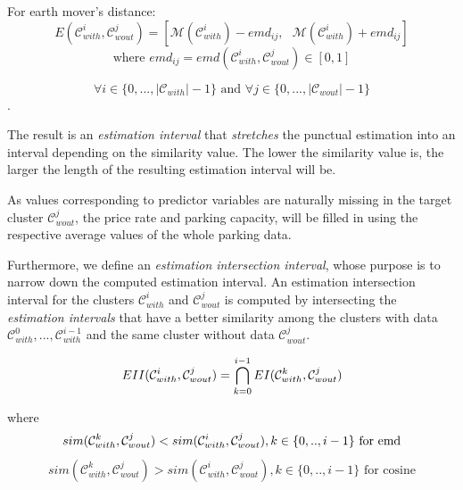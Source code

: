 \documentclass{ws-ijait}
\begin{document}
		For earth mover's distance:
		\begin{equation}
		E(\mathcal{C}_{with}^i,\mathcal{C}_{wout}^j) = [\mathcal{M}(\mathcal{C}_{with}^i) - emd_{ij},   \text{    }\mathcal{M}(\mathcal{C}_{with}^i) + emd_{ij}]
		\end{equation}
		$$\text{where } emd_{ij} = emd(\mathcal{C}_{with}^i,\mathcal{C}_{wout}^j) \in [0,1]$$
		
		$$\forall i \in \{0,...,|\mathcal{C}_{with}|-1\} \text{ and } \forall j \in \{0,...,|\mathcal{C}_{wout}|-1\}$$.
		
		The result is an \textit{estimation interval} that \textit{stretches} the punctual estimation into an interval depending on the similarity value. The lower the similarity value is, the larger the length of the resulting estimation interval will be.
		
		As values corresponding to predictor variables are naturally missing in the target cluster $\mathcal{C}_{wout}^j$, the price rate and parking capacity, will be filled in using the respective average values of the whole parking data. 
		
		Furthermore, we define an \textit{estimation intersection interval}, whose purpose is to narrow down the computed estimation interval.
		An estimation intersection interval for the clusters $\mathcal{C}_{with}^i$ and $\mathcal{C}_{wout}^j$ is computed by intersecting the \textit{estimation intervals} that have a better similarity among the clusters with data $\mathcal{C}_{with}^{0}, ..., \mathcal{C}_{with}^{i-1}$ and the same cluster without data $\mathcal{C}_{wout}^j$.
		
		\begin{equation}
		EII(\mathcal{C}_{with}^i,\mathcal{C}_{wout}^j) = \bigcap_{k=0}^{i-1} EI(\mathcal{C}_{with}^k,\mathcal{C}_{wout}^j) \\
		\end{equation}
		
		where
		\begin{equation}
		sim(\mathcal{C}_{with}^k,\mathcal{C}_{wout}^j) < sim(\mathcal{C}_{with}^i,\mathcal{C}_{wout}^j), k \in \{0,..,i - 1\} \text{ for emd}\\
		\end{equation}
		\begin{equation}
		sim(\mathcal{C}_{with}^k,\mathcal{C}_{wout}^j) > sim(\mathcal{C}_{with}^i,\mathcal{C}_{wout}^j), k \in \{0,..,i - 1\} \text{ for cosine} 
		\end{equation}
		
\end{document}
